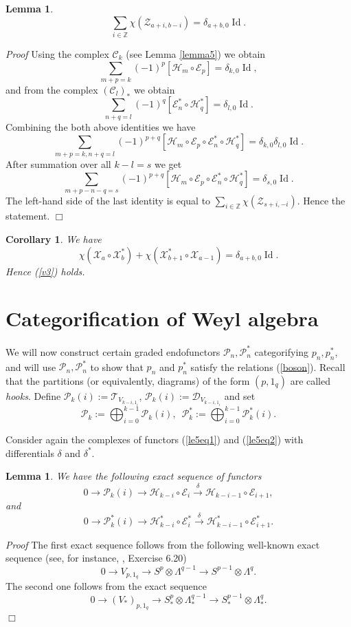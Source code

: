 \documentclass[11pt]{amsart}
\newcounter{theorem}
\newtheorem{lemma}[theo]{Lemma}
\newtheorem{corollary}[theo]{Corollary}
\renewenvironment{proof}{ \emph{Proof}}{$\Box$}
\begin{document}
\begin{lemma}\label{zchar}
$$\sum_{i\in\mathbb Z}\chi(\mathcal Z_{a+i,b-i})=\delta_{a+b,0}\operatorname{Id}.$$
\end{lemma}
\begin{proof} Using the complex $\mathcal C_k$ (see Lemma \ref{lemma5}) we obtain
$$\sum_{m+p=k} (-1)^p [\mathcal H_m\circ \mathcal E_p]=\delta_{k,0}\operatorname{Id},$$
and from the complex $(\mathcal C_l)_*$ we obtain
$$\sum_{n+q=l} (-1)^q  [\mathcal E^*_n\circ \mathcal H^*_q]=\delta_{l,0}\operatorname{Id}.$$
Combining the both above identities we have
$$\sum_{m+p=k,n+q=l} (-1)^{p+q} [\mathcal H_m\circ  \mathcal E_p\circ  \mathcal E^*_{n}\circ \mathcal H^*_{q}]=\delta_{k,0}\delta_{l,0}\operatorname{Id}.$$
After summation over all $k-l=s$ we get
$$\sum_{m+p-n-q=s} (-1)^{p+q} [\mathcal H_m\circ  \mathcal E_p\circ \mathcal E^*_n\circ \mathcal H^*_{q}]=\delta_{s,0}\operatorname{Id}.$$
The left-hand side of the last identity is equal to
$\sum_{i\in\mathbb Z}\chi(\mathcal Z_{s+i,-i})$.
Hence the statement.
\end{proof}
\begin{corollary} We have
$$\chi(\mathcal X_a\circ\mathcal X^*_b)+\chi(\mathcal  X^*_{b+1}\circ\mathcal X_{a-1})=\delta_{a+b,0}\operatorname{Id}.$$
Hence (\ref{v3}) holds.
\end{corollary}

\section{Categorification of Weyl algebra}
We will now construct  certain graded endofunctors $\mathcal P_n,\mathcal P^*_n$ categorifying
$p_n,p_n^*$, and will use   $\mathcal P_n,\mathcal P^*_n$ to show that $p_n$ and $p^*_n$ satisfy the relations
(\ref{boson}). Recall that the partitions (or equivalently, diagrams) of the form $(p,1_q)$ are called {\it hooks}.
Define $\mathcal P_k(i):=\mathcal T_{V_{k-i,1_i}}$, $\mathcal P_k(i):=\mathcal D_{V_{k-i,1_i}}$ and set
$$\mathcal P_k:=\bigoplus_{i=0}^{k-1}\mathcal P_k(i),\,\,\,\mathcal P^*_k:=\bigoplus_{i=0}^{k-1}\mathcal P^*_k(i).$$

Consider again the complexes of functors (\ref{le5eq1}) and
(\ref{le5eq2}) with differentials $\delta$ and $\delta^*$.

\begin{lemma}\label{hookkoszul} We have the following exact sequence of functors
$$0\to\mathcal P_k(i)\to\mathcal H_{k-i}\circ\mathcal E_i\xrightarrow{\delta}\mathcal H_{k-i-1}\circ\mathcal E_{i+1},$$ 
and
$$0\to\mathcal P^*_k(i)\to\mathcal H^*_{k-i}\circ\mathcal E^*_i\xrightarrow{\delta}\mathcal H^*_{k-i-1}\circ\mathcal E^*_{i+1}.$$
\end{lemma}
\begin{proof} The first exact sequence follows from the following well-known exact sequence (see, for instance, \cite{FH}, Exercise 6.20)
$$0\to V_{p,1_q}\to S^p\otimes \Lambda^{q-1}\to  S^{p-1}\otimes \Lambda^{q}.$$
The second one follows from the exact sequence
$$0\to (V_*)_{p,1_q}\to S_*^p\otimes \Lambda_*^{q-1}\to  S_*^{p-1}\otimes \Lambda_*^{q}.$$
\end{proof}
\end{document}
